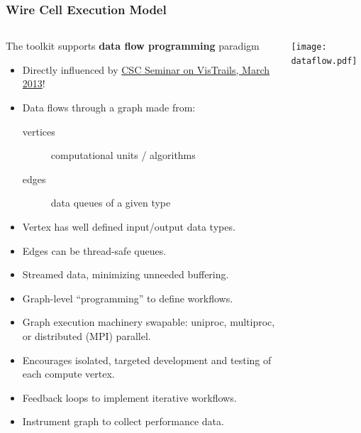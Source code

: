 \documentclass[xcolor=dvipsnames]{beamer}
\begin{document}
\begin{frame}[fragile]
  \frametitle{Wire Cell Execution Model}

  \begin{columns}
    \begin{column}{0.7\textwidth}
      \footnotesize 
      The toolkit supports \textbf{data flow programming} paradigm
      \begin{itemize}
        \item Directly influenced by \href{http://www0.bnl.gov/events/details.php?q=8932}{CSC Seminar on VisTrails, March 2013}!
        \item Data flows through a graph made from:
          \begin{description}
          \item[vertices] computational units / algorithms
          \item[edges] data queues of a given type
          \end{description}
        \item Vertex has well defined input/output data types.
        \item Edges can be thread-safe queues.
        \item Streamed data, minimizing unneeded buffering.
        \item Graph-level ``programming'' to define workflows.
        \item Graph execution machinery swapable: uniproc, multiproc, or
          distributed (MPI) parallel.
        \item Encourages isolated, targeted development and testing of each
          compute vertex.
        \item Feedback loops to implement iterative workflows.
        \item Instrument graph to collect performance data.
        \end{itemize}
      \end{column}
      \begin{column}{0.3\textwidth}

        \vspace{-10mm}

        \texttt{[image: dataflow.pdf]}
      \end{column}
    \end{columns}
\end{frame}
\end{document}
